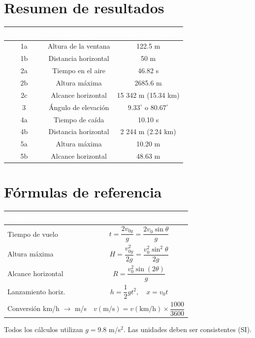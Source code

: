 \documentclass[10pt,a4paper]{article}
\begin{document}
\section{Resumen de resultados}
\begin{tabularx}{\textwidth}{CCC}
  \toprule{}
  \textbf{\textcolor{white}{Problema}} & \textbf{\textcolor{white}{Incógnita}} & \textbf{\textcolor{white}{Resultado}} \\
  \midrule
  1a & Altura de la ventana & 122.5 m \\
  1b & Distancia horizontal & 50 m \\
  2a & Tiempo en el aire & 46.82 s \\
  2b & Altura máxima & 2685.6 m \\
  2c & Alcance horizontal & 15 342 m (15.34 km) \\
  3 & Ángulo de elevación & $9.33^\circ$  o  $80.67^\circ$ \\
  4a & Tiempo de caída & 10.10 s \\
  4b & Distancia horizontal & 2 244 m (2.24 km) \\
  5a & Altura máxima & 10.20 m \\
  5b & Alcance horizontal & 48.63 m \\
  \bottomrule
\end{tabularx}
\vspace{10pt}
\section{Fórmulas de referencia}
\begin{tabularx}{\textwidth}{LC}
  \toprule{}
  \textbf{\textcolor{white}{Magnitud}} & \textbf{\textcolor{white}{Fórmula}} \\
  \midrule{}
  Tiempo de vuelo    & $t = \dfrac{2 v_{0y}}{g} = \dfrac{2 v_0 \sin\theta}{g}$ \\
  Altura máxima      & $H = \dfrac{v_{0y}^2}{2g} = \dfrac{v_0^2 \sin^2\theta}{2g}$ \\
  Alcance horizontal & $R = \dfrac{v_0^2 \sin(2\theta)}{g}$ \\
  Lanzamiento horiz. & $h = \dfrac{1}{2} g t^2,\quad x = v_0 t$ \\
  Conversi\'on km/h $\to$ m/s & $v(\text{m/s}) = v(\text{km/h}) \times \dfrac{1000}{3600}$ \\
  \bottomrule
\end{tabularx}
\vspace{10pt}
\begin{tcolorbox}[colback=grisclr, colframe=gris, arc=4pt, boxrule=0.3pt,
  left=8pt, right=8pt, top=4pt, bottom=4pt, width=\textwidth]
  \small\textcolor{gris}{Todos los cálculos utilizan $g = 9.8$ m/s$^2$. Las unidades deben ser consistentes (SI).}
\end{tcolorbox}
\end{document}
